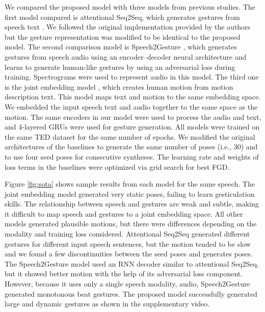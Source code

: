 \documentclass[acmtog]{acmart}
\begin{document}
We compared the proposed model with three models from previous studies. The first model compared is attentional Seq2Seq, which generates gestures from speech text \cite{yoon2019robots}. We followed the original implementation provided by the authors but the gesture representation was modified to be identical to the proposed model. The second comparison model is Speech2Gesture \cite{ginosar2019gestures}, which generates gestures from speech audio using an encoder--decoder neural architecture and learns to generate human-like gestures by using an adversarial loss during training. Spectrograms were used to represent audio in this model. The third one is the joint embedding model \cite{ahuja2019language2pose}, which creates human motion from motion description text. This model maps text and motion to the same embedding space. We embedded the input speech text and audio together to the same space as the motion. The same encoders in our model were used to process the audio and text, and 4-layered GRUs were used for gesture generation. All models were trained on the same TED dataset for the same number of epochs. We modified the original architectures of the baselines to generate the same number of poses (i.e., 30) and to use four seed poses for consecutive syntheses. The learning rate and weights of loss terms in the baselines were optimized via grid search for best FGD. 

Figure \ref{fig:sota} shows sample results from each model for the same speech. The joint embedding model generated very static poses, failing to learn gesticulation skills. The relationship between speech and gestures are weak and subtle, making it difficult to map speech and gestures to a joint embedding space. All other models generated plausible motions, but there were differences depending on the modality and training loss considered. Attentional Seq2Seq generated different gestures for different input speech sentences, but the motion tended to be slow and we found a few discontinuities between the seed poses and generates poses. The Speech2Gesture model used an RNN decoder similar to attentional Seq2Seq, but it showed better motion with the help of its adversarial loss component. However, because it uses only a single speech modality, audio, Speech2Gesture generated monotonous beat gestures. The proposed model successfully generated large and dynamic gestures as shown in the supplementary video.
\end{document}
